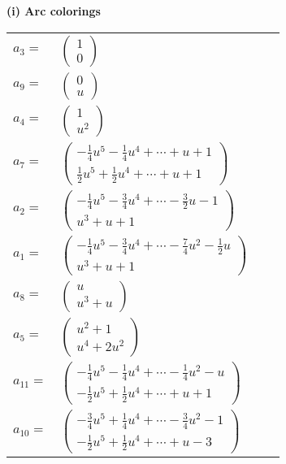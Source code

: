 \documentclass[1p]{elsarticle_modified}
\theoremstyle{definition}
\begin{document}
\flushleft \textbf{(i) Arc colorings}\\
\begin{tabular}{m{7pt} m{180pt} m{7pt} m{180pt} }
\flushright $a_{3}=$&$\begin{pmatrix}1\\0\end{pmatrix}$ \\
\flushright $a_{9}=$&$\begin{pmatrix}0\\u\end{pmatrix}$ \\
\flushright $a_{4}=$&$\begin{pmatrix}1\\u^2\end{pmatrix}$ \\
\flushright $a_{7}=$&$\begin{pmatrix}-\frac{1}{4} u^5-\frac{1}{4} u^4+\cdots+u+1\\\frac{1}{2} u^5+\frac{1}{2} u^4+\cdots+u+1\end{pmatrix}$ \\
\flushright $a_{2}=$&$\begin{pmatrix}-\frac{1}{4} u^5-\frac{3}{4} u^4+\cdots-\frac{3}{2} u-1\\u^3+u+1\end{pmatrix}$ \\
\flushright $a_{1}=$&$\begin{pmatrix}-\frac{1}{4} u^5-\frac{3}{4} u^4+\cdots-\frac{7}{4} u^2-\frac{1}{2} u\\u^3+u+1\end{pmatrix}$ \\
\flushright $a_{8}=$&$\begin{pmatrix}u\\u^3+u\end{pmatrix}$ \\
\flushright $a_{5}=$&$\begin{pmatrix}u^2+1\\u^4+2 u^2\end{pmatrix}$ \\
\flushright $a_{11}=$&$\begin{pmatrix}-\frac{1}{4} u^5-\frac{1}{4} u^4+\cdots-\frac{1}{4} u^2- u\\-\frac{1}{2} u^5+\frac{1}{2} u^4+\cdots+u+1\end{pmatrix}$ \\
\flushright $a_{10}=$&$\begin{pmatrix}-\frac{3}{4} u^5+\frac{1}{4} u^4+\cdots-\frac{3}{4} u^2-1\\-\frac{1}{2} u^5+\frac{1}{2} u^4+\cdots+u-3\end{pmatrix}$ \\

\end{tabular}
\end{document}
